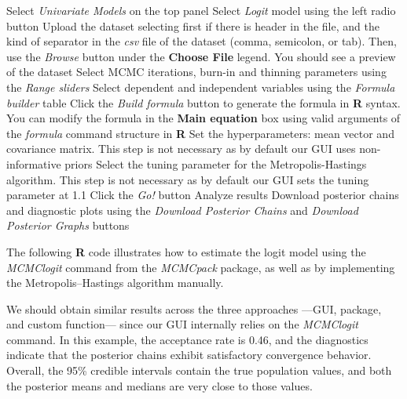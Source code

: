 \begin{algorithm}[h!]
	\caption{Logit model}\label{alg:Logit}
	\begin{algorithmic}[1]  		 			
		\State Select \textit{Univariate Models} on the top panel
		\State Select \textit{Logit} model using the left radio button
		\State Upload the dataset selecting first if there is header in the file, and the kind of separator in the \textit{csv} file of the dataset (comma, semicolon, or tab). Then, use the \textit{Browse} button under the \textbf{Choose File} legend. You should see a preview of the dataset
		\State Select MCMC iterations, burn-in and thinning parameters using the \textit{Range sliders}
		\State Select dependent and independent variables using the \textit{Formula builder} table
		\State Click the \textit{Build formula} button to generate the formula in \textbf{R} syntax. You can modify the formula in the \textbf{Main equation} box using valid arguments of the \textit{formula} command structure in \textbf{R}
		\State Set the hyperparameters: mean vector and covariance matrix. This step is not necessary as by default our GUI uses non-informative priors
		\State Select the tuning parameter for the Metropolis-Hastings algorithm. This step is not necessary as by default our GUI sets the tuning parameter at 1.1
		\State Click the \textit{Go!} button
		\State Analyze results
		\State Download posterior chains and diagnostic plots using the \textit{Download Posterior Chains} and \textit{Download Posterior Graphs} buttons
	\end{algorithmic} 
\end{algorithm}

The following \textbf{R} code illustrates how to estimate the logit model using the \textit{MCMClogit} command from the \textit{MCMCpack} package, as well as by implementing the Metropolis–Hastings algorithm manually.

We should obtain similar results across the three approaches —GUI, package, and custom function— since our GUI internally relies on the \textit{MCMClogit} command. In this example, the acceptance rate is 0.46, and the diagnostics indicate that the posterior chains exhibit satisfactory convergence behavior. Overall, the 95\% credible intervals contain the true population values, and both the posterior means and medians are very close to those values.

